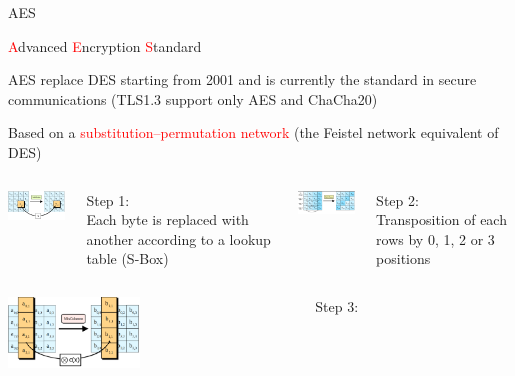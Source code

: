 \begin{frame}{AES}

\small

  \textcolor{red}{A}dvanced \textcolor{red}{E}ncryption \textcolor{red}{S}tandard

  \medskip

  AES replace DES starting from 2001 and is currently the standard in secure communications (TLS1.3 support only AES and ChaCha20)

  \medskip
  
  Based on a \textcolor{red}{substitution–permutation network} (the Feistel network equivalent of DES)

  \medskip
  
  \begin{columns}
  \begin{column}{0.25\textwidth}
    \includegraphics[width=3.5cm]{img/AES-1.png}
  \end{column}
  \begin{column}{0.25\textwidth}  
    Step 1: \\
    
    Each byte is replaced with another according to a lookup table (S-Box)
  \end{column}
  \begin{column}{0.25\textwidth}
    \includegraphics[width=3.5cm]{img/AES-2.png}
  \end{column}
  \begin{column}{0.25\textwidth}
    Step 2:\\
    
    Transposition of each rows by 0, 1, 2 or 3 positions
  \end{column}
  \end{columns}

  
  \begin{columns}
  \begin{column}{0.25\textwidth}
    \includegraphics[width=3.5cm]{img/AES-3.png}
  \end{column}
  \begin{column}{0.25\textwidth}
    Step 3: \\
    

\end{column}
\end{columns}
\end{frame}
